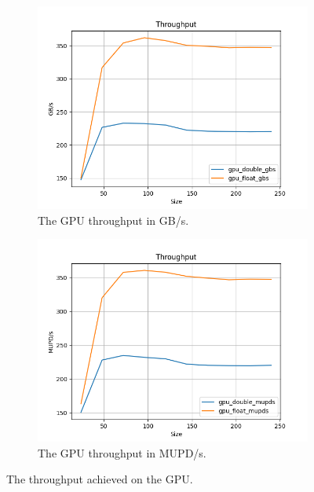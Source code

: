 \documentclass[10pt]{article}
\begin{document}
\begin{figure}[!ht]
        \centering
    \begin{subfigure}[b]{0.49\textwidth}
        \centering
        \includegraphics[width=\linewidth]{gpu_gbs.png}
        \caption{The GPU throughput in GB/s.}
        \label{fig:gpu_gbs}
    \end{subfigure}\hfill
    \begin{subfigure}[b]{0.49\textwidth}
        \centering
        \includegraphics[width=\linewidth]{gpu_mupds.png}
        \caption{The GPU throughput in MUPD/s.}
        \label{fig:gpu_mupds}
    \end{subfigure}\hfill
    \caption{The throughput achieved on the GPU.}
    \label{fig:gpu}
\end{figure}
\end{document}

